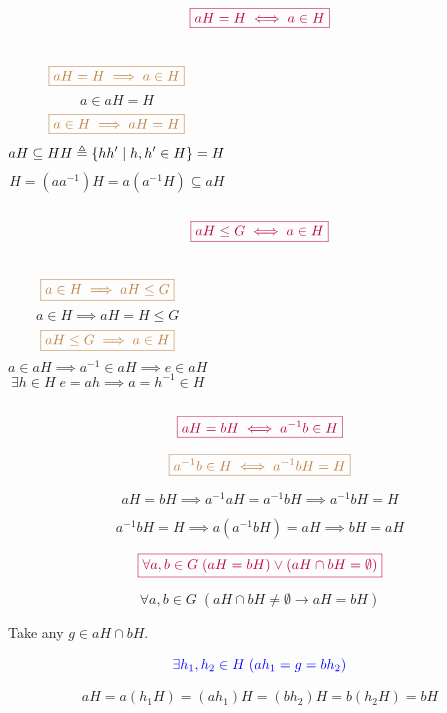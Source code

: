 \begin{frame}
  \[
    \textcolor{purple}{\boxed{aH = H \iff a \in H}}
  \]

  \vspace{1em}
  \begin{columns}[t]
      \pause
      \[
        \textcolor{brown}{\boxed{aH = H \implies a \in H}}
      \]
      \pause
      \[
        a \in aH = H
      \]
      \pause
      \[
        \textcolor{brown}{\boxed{a \in H \implies aH = H}}
      \]
      \pause
      \[
        aH \subseteq H H \triangleq \{hh' \mid h, h' \in H\} = H
      \]
      \pause
      \[
        H = (aa^{-1})H = a(a^{-1}H) \subseteq aH
      \]
  \end{columns}
\end{frame}

\begin{frame}
  \[
    \textcolor{purple}{\boxed{aH \le G \iff a \in H}}
  \]

  \vspace{1em}
  \begin{columns}[t]
      \pause
      \[
        \textcolor{brown}{\boxed{a \in H \implies aH \le G}}
      \]
      \pause
      \[
        a \in H \implies aH = H \le G
      \]
      \pause
      \[
        \textcolor{brown}{\boxed{aH \le G \implies a \in H}}
      \]
      \pause
      \[
        a \in aH \implies a^{-1} \in aH \implies e \in aH
      \]
      \pause
      \[
        \exists h \in H\; e = ah \implies a = h^{-1} \in H
      \]
  \end{columns}
\end{frame}

\begin{frame}
  \[
    \textcolor{purple}{\boxed{aH = bH \iff a^{-1}b \in H}}
  \]

  \pause
  \[
    \textcolor{brown}{\boxed{a^{-1}b \in H \iff a^{-1}b H = H}}
  \]

  \pause
  \[
    aH = bH \implies a^{-1}aH = a^{-1}bH \implies a^{-1}bH = H
  \]

  \pause
  \[
    a^{-1}b H = H \implies a(a^{-1}bH) = aH \implies bH = aH
  \]
\end{frame}

\begin{frame}
  \[
    \textcolor{purple}{\boxed{\forall a, b \in G\; (aH = bH)
      \lor (aH \cap bH = \emptyset)}}
  \]

  \pause
  \[
    \forall a, b \in G\; (aH \cap bH \neq \emptyset \to aH = bH)
  \]

  \pause
  \vspace{0.30cm}
  \begin{center}
    Take any $g \in aH \cap bH$.
  \end{center}

  \pause
  \[
    \textcolor{blue}{\exists h_{1}, h_{2} \in H\;
      (ah_{1} = g = bh_{2})}
  \]

  \pause
  \[
    aH = a(h_{1}H) = (ah_{1})H = (bh_{2})H = b(h_{2}H) = bH
  \]
\end{frame}

